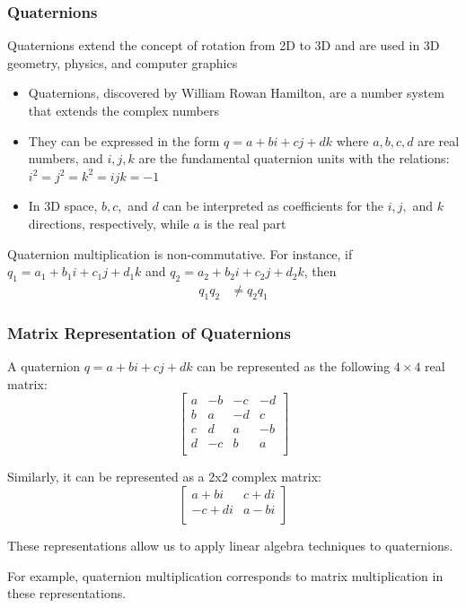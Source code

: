 \documentclass[fullscreen=true, bookmarks=true, hyperref={pdfencoding=unicode}]{beamer}
\begin{document}
\begin{frame}
  \frametitle{Quaternions}

  Quaternions extend the concept of rotation from 2D to 3D and 
  are used in 3D geometry, physics, and computer graphics

  \begin{itemize}
    \pause\item Quaternions, discovered by William Rowan Hamilton, are a number system that extends the complex numbers
    \pause\item They can be expressed in the form $q = a + bi + cj + dk$ where $a, b, c, d$ are real numbers, and $i, j, k$ are the fundamental quaternion units with the relations: $i^2 = j^2 = k^2 = ijk = -1$
    \pause\item In 3D space, $b, c,$ and $d$ can be interpreted as coefficients for the $i, j,$ and $k$ directions, respectively, while $a$ is the real part
  \end{itemize}
  
  \pause
  \begin{example}
    Quaternion multiplication is non-commutative. 
    For instance, if $q_1 = a_1 + b_1i + c_1j + d_1k$ and $q_2 = a_2 + b_2i + c_2j + d_2k$, then
    \begin{align*}
      q_1 q_2 &\neq q_2 q_1
    \end{align*}
  \end{example}

\end{frame}


\begin{frame}
  \frametitle{Matrix Representation of Quaternions}

  \pause
  A quaternion $q = a + bi + cj + dk$ can be represented 
  as the following $4\times 4$ real matrix:
  \[
  \begin{bmatrix}
    a & -b & -c & -d \\
    b & a & -d & c \\
    c & d & a & -b \\
    d & -c & b & a \\
  \end{bmatrix}
  \]

  \pause
  Similarly, it can be represented as a 2x2 complex matrix:
  \[
  \begin{bmatrix}
    a + bi & c + di \\
    -c + di & a - bi \\
  \end{bmatrix}
  \]

  \pause
  These representations allow us to apply linear algebra techniques to quaternions. 
  
  \pause
  For example, quaternion multiplication corresponds to matrix multiplication in these representations.
\end{frame}
\end{document}
